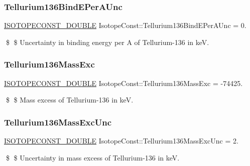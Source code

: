 \subsubsection{\texorpdfstring{Tellurium136\+Bind\+E\+Per\+A\+Unc}{Tellurium136BindEPerAUnc}}
{\footnotesize\ttfamily \mbox{\hyperlink{group___isotope_const-_macros_ga8f45a7272ce02c0b4c65c44636ed719a}{I\+S\+O\+T\+O\+P\+E\+C\+O\+N\+S\+T\+\_\+\+D\+O\+U\+B\+LE}} Isotope\+Const\+::\+Tellurium136\+Bind\+E\+Per\+A\+Unc = 0.}

\$ \$ Uncertainty in binding energy per A of Tellurium-\/136 in keV. \mbox{\label{group___isotope_const-_tellurium-_te136_gadefb60bc350c858d2cb6aab70d2eddb1}} 
\subsubsection{\texorpdfstring{Tellurium136\+Mass\+Exc}{Tellurium136MassExc}}
{\footnotesize\ttfamily \mbox{\hyperlink{group___isotope_const-_macros_ga8f45a7272ce02c0b4c65c44636ed719a}{I\+S\+O\+T\+O\+P\+E\+C\+O\+N\+S\+T\+\_\+\+D\+O\+U\+B\+LE}} Isotope\+Const\+::\+Tellurium136\+Mass\+Exc = -\/74425.}

\$ \$ Mass excess of Tellurium-\/136 in keV. \mbox{\label{group___isotope_const-_tellurium-_te136_ga6f806a8f46637f9ec55e94b8cbb38e70}} 
\subsubsection{\texorpdfstring{Tellurium136\+Mass\+Exc\+Unc}{Tellurium136MassExcUnc}}
{\footnotesize\ttfamily \mbox{\hyperlink{group___isotope_const-_macros_ga8f45a7272ce02c0b4c65c44636ed719a}{I\+S\+O\+T\+O\+P\+E\+C\+O\+N\+S\+T\+\_\+\+D\+O\+U\+B\+LE}} Isotope\+Const\+::\+Tellurium136\+Mass\+Exc\+Unc = 2.}

\$ \$ Uncertainty in mass excess of Tellurium-\/136 in keV. \mbox{\label{group___isotope_const-_tellurium-_te136_ga63e967b19a8f7df0996005650f4bac78}} 
